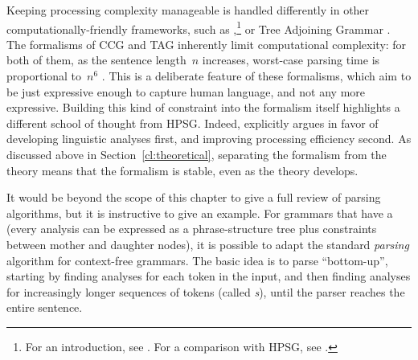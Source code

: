 \documentclass[output=paper
	        ,collection
	        ,collectionchapter
 	        ,biblatex
                ,babelshorthands
                ,newtxmath
                ,draftmode
                ,colorlinks, citecolor=brown
]{langscibook}
\begin{document}
Keeping processing complexity manageable is handled differently
in other computationally-friendly frameworks,
such as ,\footnote{%
	For an introduction, see \citet{steedman2011ccg}.
	For a comparison with HPSG, see .
}
or Tree Adjoining Grammar \citep[TAG;][]{Joshi87a-u,SAJ88a-u}.
The formalisms of CCG and TAG inherently limit computational complexity:
for both of them, as the sentence length~$n$ increases,
worst-case parsing time is proportional to~$n^6$ \citep{Kasamietal1989}.
This is a deliberate feature of these formalisms,
which aim to be just expressive enough to capture human language,
and not any more expressive.
Building this kind of constraint into the formalism itself
highlights a different school of thought from HPSG.
Indeed, \citet[64]{MuellerCoreGram} explicitly argues
in favor of developing linguistic analyses first,
and improving processing efficiency second.
As discussed above in Section~\ref{cl:theoretical},
separating the formalism from the theory
means that the formalism is stable, even as the theory develops.


It would be beyond the scope of this chapter
to give a full review of parsing algorithms,
but it is instructive to give an example.
For grammars that have a 
(every analysis can be expressed as a phrase-structure tree
plus constraints between mother and daughter nodes),
it is possible to adapt the standard \textit{parsing} algorithm \citep{kay:1973} for context-free grammars.
The basic idea is to parse ``bottom-up'',
starting by finding analyses for each token in the input,
and then finding analyses for increasingly longer sequences of tokens (called \textit{s}),
until the parser reaches the entire sentence.
\end{document}
